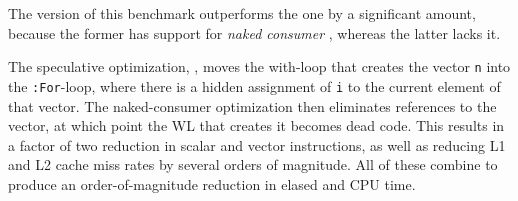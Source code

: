 The \awlf version of this benchmark outperforms the \wlf one 
by a significant amount, because the former has support for
{\em naked consumer \awlf}, whereas the latter
lacks it.

The speculative optimization, \wlprop, moves the with-loop
that creates the vector {\tt \qiota\0n} into the {\tt :For}-loop, where
there is a hidden assignment of {\tt i} to the current element
of that vector. The naked-consumer \awlf optimization
then eliminates references to the vector, at which point 
the WL that creates it becomes dead code. 
This results in a factor of two reduction
in scalar and vector instructions, as well as reducing
L1 and L2 cache miss rates by several orders of magnitude.
All of these combine to produce an order-of-magnitude
reduction in elased and CPU time.

